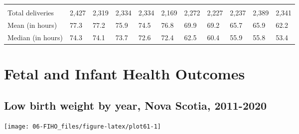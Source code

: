 \documentclass[
]{krantz}
\begin{document}
\begin{table}[H]
{\begin{tabular}[t]{lllllllllll}
\cellcolor[HTML]{E1E1E1}{\textbf{Caesarean section}} & \cellcolor[HTML]{E1E1E1}{\textbf{}} & \cellcolor[HTML]{E1E1E1}{\textbf{}} & \cellcolor[HTML]{E1E1E1}{\textbf{}} & \cellcolor[HTML]{E1E1E1}{\textbf{}} & \cellcolor[HTML]{E1E1E1}{\textbf{}} & \cellcolor[HTML]{E1E1E1}{\textbf{}} & \cellcolor[HTML]{E1E1E1}{\textbf{}} & \cellcolor[HTML]{E1E1E1}{\textbf{}} & \cellcolor[HTML]{E1E1E1}{\textbf{}} & \cellcolor[HTML]{E1E1E1}{\textbf{}}\\
Total deliveries & 2,427 & 2,319 & 2,334 & 2,334 & 2,169 & 2,272 & 2,227 & 2,237 & 2,389 & 2,341\\
Mean (in hours) & 77.3 & 77.2 & 75.9 & 74.5 & 76.8 & 69.9 & 69.2 & 65.7 & 65.9 & 62.2\\
Median (in hours) & 74.3 & 74.1 & 73.7 & 72.6 & 72.4 & 62.5 & 60.4 & 55.9 & 55.8 & 53.4\\
\bottomrule
\end{tabular}}
\end{table}

\hypertarget{section-6}{%
\chapter{Fetal and Infant Health Outcomes}\label{section-6}}

\hypertarget{section-61}{%
\section{Low birth weight by year, Nova Scotia, 2011-2020}\label{section-61}}

\begin{center}\texttt{[image: 06-FIHO\_files/figure-latex/plot61-1]} \end{center}
\end{document}
